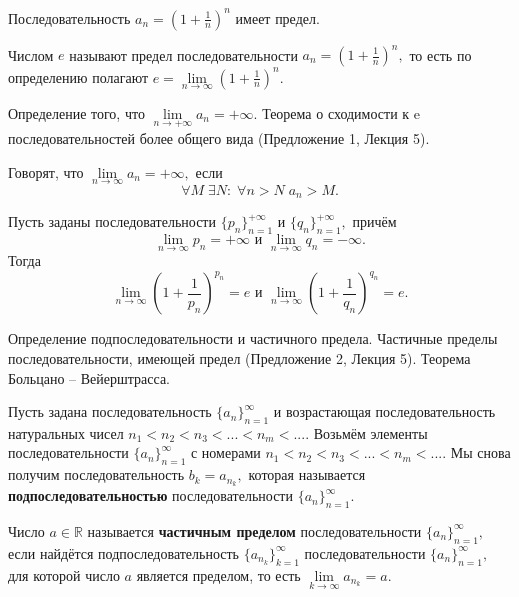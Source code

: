 \begin{theorem}
	Последовательность $a_n=\left(1+\frac{1}{n}\right)^n$
	имеет предел.
\end{theorem}
\begin{definition}
	Числом $e$ называют предел последовательности
	$a_n=\left(1+\frac{1}{n}\right)^n,$
	то есть по определению полагают
	$e=\lim\limits_{n\rightarrow\infty}
		\left(1+\frac{1}{n}\right)^n.$
\end{definition}


\newpage
\begin{problem}
Определение того, что $\lim\limits_{n \to + \infty} a_n = +\infty$. Теорема о сходимости к e последовательностей
более общего вида (Предложение 1, Лекция 5).
\end{problem}

\begin{definition}
	Говорят, что
	$\lim\limits_{n\rightarrow\infty}a_n=+\infty,$
	если
	$$
		\forall M\;\exists N:\;\forall n>N\;
		a_n>M.
	$$
\end{definition}
\begin{theorem}
	Пусть заданы последовательности
	$\{p_n\}_{n=1}^{+\infty}$ и
	$\{q_n\}_{n=1}^{+\infty},$ причём
	$$\lim\limits_{n\rightarrow\infty}p_n=+\infty
		\textrm{ и }\lim\limits_{n\rightarrow\infty}q_n=-\infty.$$
	Тогда
	$$
		\lim\limits_{n\rightarrow\infty}\left(1+\frac{1}{p_n}\right)^{p_n}=e
		\textrm{ и }
		\lim\limits_{n\rightarrow\infty}\left(1+\frac{1}{q_n}\right)^{q_n}=e.
	$$
\end{theorem}

\newpage
\begin{problem}
Определение подпоследовательности и частичного предела. Частичные пределы последовательности, имеющей предел (Предложение 2, Лекция 5). Теорема Больцано – Вейерштрасса.\end{problem}
\begin{definition}
	Пусть задана последовательность
	$\{a_n\}_{n=1}^{\infty}$ и возрастающая
	последовательность натуральных чисел
	$n_1<n_2<n_3<...<n_m<....$ Возьмём
	элементы последовательности
	$\{a_n\}_{n=1}^{\infty}$ с номерами
	$n_1<n_2<n_3<...<n_m<....$ Мы снова получим
	последовательность $b_k=a_{n_k},$ которая
	называется \textbf{подпоследовательностью}
	последовательности $\{a_n\}_{n=1}^{\infty}.$

	Число $a\in\mathbb{R}$ называется
	\textbf{частичным пределом} последовательности
	$\{a_n\}_{n=1}^{\infty},$ если найдётся
	подпоследовательность $\{a_{n_k}\}_{k=1}^{\infty}$
	последовательности $\{a_n\}_{n=1}^{\infty},$
	для которой число $a$ является пределом,
	то есть $\lim\limits_{k\rightarrow\infty}
		a_{n_k}=a.$
\end{definition}

